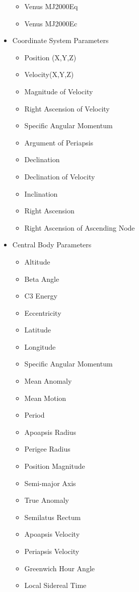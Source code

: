 \begin{itemize}
\begin{itemize}
            \item Venus MJ2000Eq
            \item Venus MJ2000Ec
        \end{itemize}
    \item Coordinate System Parameters
        \begin{itemize}
            \item Position (X,Y,Z)
            \item Velocity(X,Y,Z)
            \item Magnitude of Velocity
            \item Right Ascension of Velocity
            \item Specific Angular Momentum
            \item Argument of Periapsis
            \item Declination
            \item Declination of Velocity
            \item Inclination
            \item Right Ascension
            \item Right Ascension of Ascending Node
        \end{itemize}
    \item Central Body Parameters
        \begin{itemize}
            \item Altitude
            \item Beta Angle
            \item C3 Energy
            \item Eccentricity
            \item Latitude
            \item Longitude
            \item Specific Angular Momentum
            \item Mean Anomaly
            \item Mean Motion
            \item Period
            \item Apoapsis Radius
            \item Perigee Radius
            \item Position Magnitude
            \item Semi-major Axis
            \item True Anomaly
            \item Semilatus Rectum
            \item Apoapsis Velocity
            \item Periapsis Velocity
            \item Greenwich Hour Angle
            \item Local Sidereal Time
        \end{itemize}
\end{itemize}

